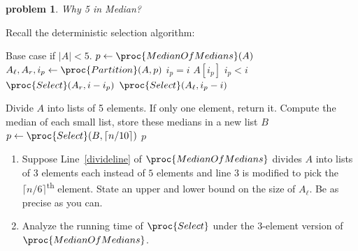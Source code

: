 \documentclass[11pt]{article}
\newtheorem{problem}{\sc\color{cit}problem}
\begin{document}
\newpage

\begin{problem}Why 5 in Median?\end{problem}
Recall the deterministic selection algorithm:
\begin{codebox}
\li Base case if $|A|<5$.
\li $p \gets \proc{MedianOfMedians}(A)$
\li $A_\ell,A_r,i_p \gets \proc{Partition}(A,p)$
\li \If $i_p=i$ \Return $A[i_p]$ 
\li \ElseIf $i_p<i$ \Return $\proc{Select}(A_r, i-i_p)$
\li \Else \Return $\proc{Select}(A_\ell,i_p-i)$ \End
\end{codebox}
\begin{codebox}
\li Divide $A$ into lists of 5 elements. If only one element, return it.\label{divideline}
\li Compute the median of each small list, store these medians in a new list $B$
\li $p\gets \proc{Select}(B,\lceil n/10 \rceil)$
\li \Return $p$
\end{codebox}
\begin{enumerate}
  \item
Suppose Line~\ref{divideline} of $\proc{MedianOfMedians}$
  divides $A$ into lists of 3 elements each instead of $5$ elements and
  line 3 is modified to pick the $\lceil n/6 \rceil$\textsuperscript{th} element.
  State an upper and lower bound on the size of $A_{\ell}$.  Be as precise as you can.
\item  
 Analyze the running time of $\proc{Select}$ under the 3-element version of 
  $\proc{MedianOfMedians}$.
\end{enumerate}
\hfill
   
\end{document}
